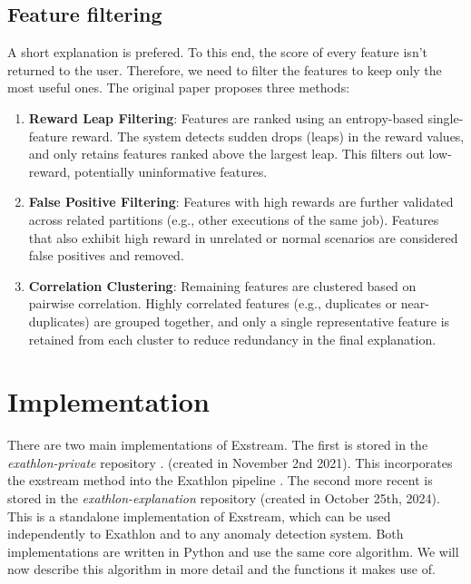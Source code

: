 \documentclass[11pt]{article}
\begin{document}
\subsection{Feature filtering}
A short explanation is prefered. To this end, the score of every feature isn't returned to the user. Therefore, we need to filter the features to keep only the most useful ones. The original paper proposes three methods:

\begin{enumerate}
    \item \textbf{Reward Leap Filtering}:
    Features are ranked using an entropy-based single-feature reward. The system detects sudden drops (leaps) in the reward values, and only retains features ranked above the largest leap. This filters out low-reward, potentially uninformative features.

    \item \textbf{False Positive Filtering}:
    Features with high rewards are further validated across related partitions (e.g., other executions of the same job). Features that also exhibit high reward in unrelated or normal scenarios are considered false positives and removed.

    \item \textbf{Correlation Clustering}:
    Remaining features are clustered based on pairwise correlation. Highly correlated features (e.g., duplicates or near-duplicates) are grouped together, and only a single representative feature is retained from each cluster to reduce redundancy in the final explanation.
\end{enumerate}

\section{Implementation}
There are two main implementations of Exstream. The first is stored in the \textit{exathlon-private} repository \cite{exathlon-private}. (created in November 2nd 2021). This incorporates the exstream method into the Exathlon pipeline \cite{Jacob2021Exathlon}. The second more recent is stored in the \textit{exathlon-explanation} repository \cite{exathlon-explanation} (created in October 25th, 2024). This is a standalone implementation of Exstream, which can be used independently to Exathlon and to any anomaly detection system. Both implementations are written in Python and use the same core algorithm. We will now describe this algorithm in more detail and the functions it makes use of.
\end{document}
